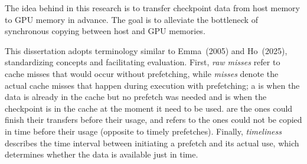 \documentclass[Ingles]{ic-tese-v3}
\begin{document}
The idea behind \checkpointprefetching in this research is to transfer checkpoint data from host memory to GPU memory in advance. The goal is to alleviate the bottleneck of synchronous copying between host and GPU memories.

This dissertation adopts terminology similar to Emma~\etal (2005)\cite{emma2005} and Ho~\etal (2025)\cite{ho2025}, standardizing concepts and facilitating evaluation. First, \textit{raw misses} refer to cache misses that would occur without prefetching, while \textit{misses} denote the actual cache misses that happen during execution with prefetching; a  is when the data is already in the cache but no prefetch was needed and  is when the checkpoint is in the cache at the moment it need to be used.  are the ones could finish their transfers before their usage, and  refers to the ones could not be copied in time before their usage (opposite to timely prefetches). Finally, \textit{timeliness} describes the time interval between initiating a prefetch and its actual use, which determines whether the data is available just in time.


\end{document}
